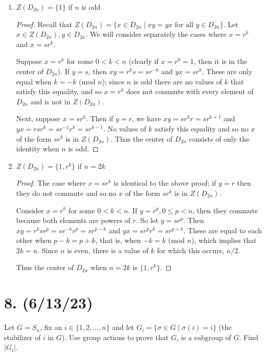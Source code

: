 \documentclass{article}
\begin{document}
\begin{enumerate}[label=(\alph*)]
    \item $Z(D_{2n}) = \{ 1 \}$ if $n$ is odd
          \begin{proof}
            Recall that $Z(D_{2n}) = \{ x \in D_{2n} \mid xy = yx \text{ for all } y \in D_{2n} \}$. Let $x \in Z(D_{2n}), y \in D_{2n}$. We will consider separately the cases where $x = r^k$ and $x = sr^k$.

            Suppose $x = r^k$ for some $0 < k < n$ (clearly if $x = r^0 = 1$, then it is in the center of $D_{2n}$). If $y = s$, then $xy = r^ks = sr^{-k}$ and $yx = sr^k$. These are only equal when $k = -k$ (mod $n$); since $n$ is odd there are no values of $k$ that satisfy this equality, and so $x = r^k$ does not commute with every element of $D_{2n}$ and is not in $Z(D_{2n})$.

            Next, suppose $x = sr^k$. Then if $y = r$, we have $xy = sr^kr = sr^{k + 1}$ and $yx = rsr^k = sr^{-1}r^k = sr^{k - 1}$. No values of $k$ satisfy this equality and so no $x$ of the form $sr^k$ is in $Z(D_{2n})$. Thus the center of $D_{2n}$ consists of only the identity when $n$ is odd.
          \end{proof}
    \item $Z(D_{2n}) = \{ 1, r^k \} $ if $n = 2k$
          \begin{proof}
            The case where $x = sr^k$ is identical to the above proof; if $y = r$ then they do not commute and so no $x$ of the form $sr^k$ is in $Z(D_{2n})$.

            Consider $x = r^k$ for some $0 < k < n$. If $y = r^p, 0 \leq p < n$, then they commute because both elements are powers of $r$. So let $y = sr^p$. Then $xy = r^ksr^p = sr^{-k}r^p = sr^{p - k}$ and $yx = sr^pr^k = sr^{p + k}$. These are equal to each other when $p - k = p + k$, that is, when $-k = k$ (mod $n$), which implies that $2k = n$. Since $n$ is even, there is a value of $k$ for which this occurs, $n / 2$.

            Thus the center of $D_{2n}$ when $n = 2k$ is $\{ 1, r^k \}$.
          \end{proof}
\end{enumerate}

\section*{8. (6/13/23)}

Let $G = S_n$, fix an $i \in \{ 1, 2, ..., n \}$ and let $G_i = \{ \sigma \in G \mid \sigma(i) = i \}$ (the stabilizer of $i$ in $G$). Use group actions to prove that $G_i$ is a subgroup of $G$. Find $|G_i|$.
\end{document}
